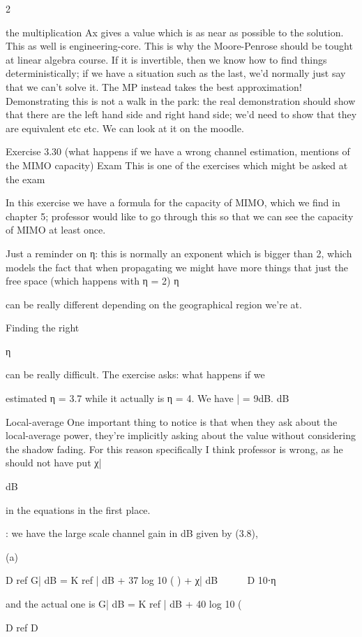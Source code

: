 {{{{{2

the multiplication Ax gives a value which is as near as possible to the solution.
This as well is engineering-core.
This is why the Moore-Penrose should be tought at linear algebra course.
If it is invertible, then we know how to find things deterministically; if we have a situation such as the last, we'd normally just say that we can't solve it. The MP instead takes the best approximation!
Demonstrating this is not a walk in the park: the real demonstration should show that there are the left hand side and right hand side; we'd need to show that they are equivalent etc etc.
We can look at it on the moodle.

Exercise 3.30 (what happens if we have a wrong channel estimation, mentions of the MIMO capacity)
Exam This is one of the exercises which might be asked at the exam

In this exercise we have a formula for the capacity of MIMO, which we find in chapter 5;
professor would like to go through this so that we can see the capacity of MIMO at least once.

Just a reminder on η: this is normally an exponent which is bigger than 2, which models the fact that when propagating we might have more things that just the free space
(which happens with η = 2)
η

can be really different depending on the geographical region we're at.

Finding the right

η

can be really difficult. The exercise asks: what happens if we

estimated η = 3.7 while it actually is η = 4.
We have \sigma| = 9dB.
dB

​Local-average One important thing to notice is that when they ask about the local-average power,
they're implicitly asking about the value without considering the shadow fading.
For this reason specifically I think professor is wrong, as he should not have put χ|

dB

in the equations in the first place.

: we have the large scale channel gain in dB given by (3.8),

(a)

D ref G| dB = K ref | dB + 37 log 10 (
) + χ| dB



D 10⋅η

and the actual one is G| dB = K ref | dB + 40 log 10 (

D ref D

}}}}}
